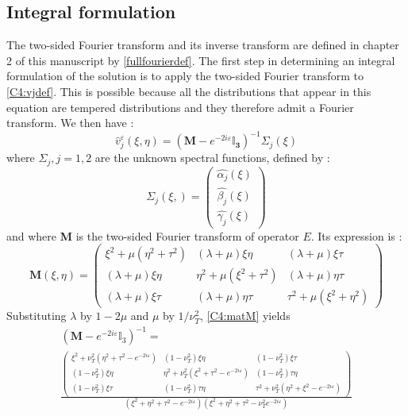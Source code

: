 \subsection{Integral formulation}
The two-sided Fourier transform and its inverse transform are defined in chapter 2 of this manuscript by \eqref{fullfourierdef}. The first step in determining an integral formulation of the solution is to apply the two-sided Fourier transform to \eqref{C4:vjdef}. This is possible because all the distributions that appear in this equation are tempered distributions and they therefore admit a Fourier transform. We then have :
\begin{equation}
\hat{v}^{\varepsilon}_j(\xi,\eta)=(\mathbf{M}-e^{-2i\varepsilon}\mathbf{\mathbb{I}_3})^{-1}\Sigma_j(\xi)
\label{C4:matMvjeps}
\end{equation}
where $\Sigma_j, j=1,2$  are the unknown spectral functions, defined by :
\begin{equation}
\Sigma_j(\xi,)=\begin{pmatrix}
\hat{\alpha_j}(\xi)\\ \hat{\beta_j}(\xi) \\ \hat{\gamma_j}(\xi)
\end{pmatrix}
\label{C4:sigmacomponents}
\end{equation}
and where \textbf{M} is the two-sided Fourier transform of operator $E$. Its expression is :
\begin{equation}
\mathbf{M}(\xi,\eta)=
\begin{pmatrix}
\xi^2+\mu(\eta^2+\tau^2) & (\lambda+\mu)\xi \eta & (\lambda+\mu)\xi\tau \\
 (\lambda+\mu)\xi \eta & \eta^2+\mu(\xi^2+\tau^2) & (\lambda+\mu)\eta\tau \\
(\lambda+\mu)\xi\tau & (\lambda+\mu)\eta\tau & \tau^2+\mu(\xi^2+\eta^2) 
\end{pmatrix}
\label{C4:matM}
\end{equation}
Substituting $\lambda$ by $1-2\mu$ and $\mu$ by $1/\nu_T^2$, \eqref{C4:matM} yields
\begin{multline}
(\mathbf{M}-e^{-2i\varepsilon}\mathbb{I}_3)^{-1}=\\
\frac{\begin{pmatrix}
\xi^2+\nu_T^2(\eta^2+\tau^2-e^{-2i\varepsilon}) & (1-\nu_T^2)\xi \eta & (1-\nu_T^2)\xi \tau \\
(1-\nu_T^2)\xi \eta & \eta^2+\nu_T^2(\xi^2+\tau^2-e^{-2i\varepsilon}) & (1-\nu_T^2)\tau \eta \\
(1-\nu_T^2)\xi \tau & (1-\nu_T^2)\tau \eta & \tau^2+\nu_T^2(\eta^2+\xi^2-e^{-2i\varepsilon})
\end{pmatrix}}{(\xi^2+\eta^2+\tau^2-e^{-2i\varepsilon})(\xi^2+\eta^2+\tau^2-\nu_T^2e^{-2i\varepsilon})} 
\end{multline}

